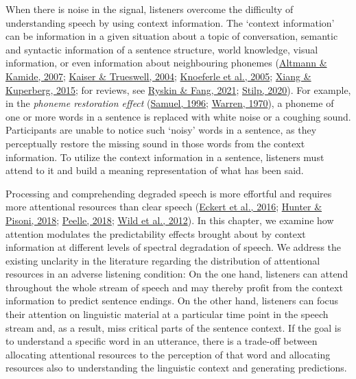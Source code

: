 \documentclass[a4paper, nobind]{templates/ociamthesis}
\begin{document}
When there is noise in the signal,
listeners overcome the difficulty of understanding speech by using context information.
The `context information' can be information in a given situation about a topic of conversation, semantic and syntactic information of a sentence structure, world knowledge, visual information, or even information about neighbouring phonemes (\protect\hyperlink{ref-Altmann2007}{Altmann \& Kamide, 2007}; \protect\hyperlink{ref-Kaiser2004}{Kaiser \& Trueswell, 2004}; \protect\hyperlink{ref-Knoeferle2005}{Knoeferle et al., 2005}; \protect\hyperlink{ref-Xiang2015}{Xiang \& Kuperberg, 2015}; for reviews, see \protect\hyperlink{ref-Ryskin2021}{Ryskin \& Fang, 2021}; \protect\hyperlink{ref-Stilp2020}{Stilp, 2020}).
For example, in the \emph{phoneme restoration effect} (\protect\hyperlink{ref-Samuel1996}{Samuel, 1996}; \protect\hyperlink{ref-Warren1970}{Warren, 1970}), a phoneme of one or more words in a sentence is replaced with white noise or a coughing sound.
Participants are unable to notice such `noisy' words in a sentence, as they perceptually restore the missing sound in those words from the context information.
To utilize the context information in a sentence, listeners must attend to it and build a meaning representation of what has been said.

Processing and comprehending degraded speech is more effortful and requires more attentional resources than clear speech (\protect\hyperlink{ref-Eckert2016}{Eckert et al., 2016}; \protect\hyperlink{ref-Hunter2018}{Hunter \& Pisoni, 2018}; \protect\hyperlink{ref-Peelle2018}{Peelle, 2018}; \protect\hyperlink{ref-Wild2012}{Wild et al., 2012}).
In this chapter, we examine how attention modulates the predictability effects brought about by context information at different levels of spectral degradation of speech.
We address the existing unclarity in the literature regarding the distribution of attentional resources in an adverse listening condition:
On the one hand, listeners can attend throughout the whole stream of speech and may thereby profit from the context information to predict sentence endings.
On the other hand, listeners can focus their attention on linguistic material at a particular time point in the speech stream and, as a result, miss critical parts of the sentence context.
If the goal is to understand a specific word in an utterance, there is a trade-off between allocating attentional resources to the perception of that word and allocating resources also to understanding the linguistic context and generating predictions.
\end{document}
